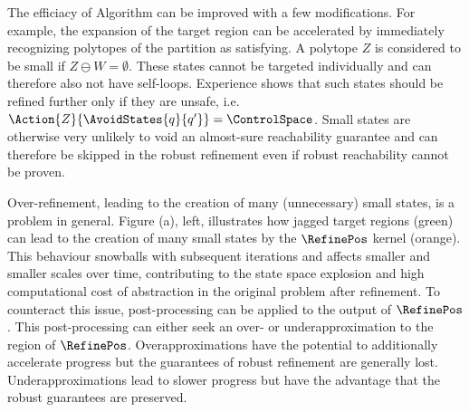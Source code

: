
    The efficiacy of Algorithm  can be improved with a few modifications.
    For example, the expansion of the target region can be accelerated by immediately recognizing  polytopes of the partition as satisfying.
    A polytope $Z$ is considered to be small if $Z \ominus W = \emptyset$.
    These states cannot be targeted individually and can therefore also not have self-loops.
    Experience shows that such states should be refined further only if they are unsafe, i.e.\ $\Action{Z}{\AvoidStates{q}{q'}} = \ControlSpace$.
    Small states are otherwise very unlikely to void an almost-sure reachability guarantee and can therefore be skipped in the robust refinement even if robust reachability cannot be proven.

    Over-refinement, leading to the creation of many (unnecessary) small states, is a problem in general.
    Figure (a), left, illustrates how jagged target regions (green) can lead to the creation of many small states by the $\RefinePos$ kernel (orange).
    This behaviour snowballs with subsequent iterations and affects smaller and smaller scales over time, contributing to the state space explosion and high computational cost of abstraction in the original problem after refinement.
    To counteract this issue, post-processing can be applied to the output of $\RefinePos$.
    This post-processing can either seek an over- or underapproximation to the region of $\RefinePos$.
    Overapproximations have the potential to additionally accelerate progress but the guarantees of robust refinement are generally lost.
    Underapproximations lead to slower progress but have the advantage that the robust guarantees are preserved.


